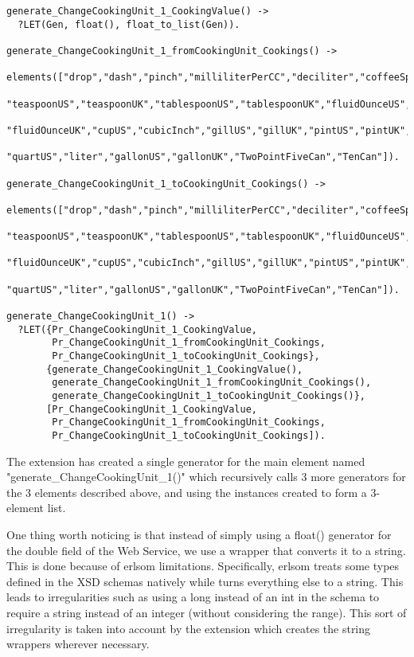 \documentclass[submission,copyright,a4]{eptcs}
\begin{document}
\begin{lstlisting}
generate_ChangeCookingUnit_1_CookingValue() ->
  ?LET(Gen, float(), float_to_list(Gen)).

generate_ChangeCookingUnit_1_fromCookingUnit_Cookings() ->
  elements(["drop","dash","pinch","milliliterPerCC","deciliter","coffeeSpoon","fluidDram",
             "teaspoonUS","teaspoonUK","tablespoonUS","tablespoonUK","fluidOunceUS",
             "fluidOunceUK","cupUS","cubicInch","gillUS","gillUK","pintUS","pintUK",
             "quartUS","liter","gallonUS","gallonUK","TwoPointFiveCan","TenCan"]).

generate_ChangeCookingUnit_1_toCookingUnit_Cookings() ->
  elements(["drop","dash","pinch","milliliterPerCC","deciliter","coffeeSpoon","fluidDram",
             "teaspoonUS","teaspoonUK","tablespoonUS","tablespoonUK","fluidOunceUS",
             "fluidOunceUK","cupUS","cubicInch","gillUS","gillUK","pintUS","pintUK",
             "quartUS","liter","gallonUS","gallonUK","TwoPointFiveCan","TenCan"]).

generate_ChangeCookingUnit_1() ->
  ?LET({Pr_ChangeCookingUnit_1_CookingValue,
        Pr_ChangeCookingUnit_1_fromCookingUnit_Cookings,
        Pr_ChangeCookingUnit_1_toCookingUnit_Cookings},
       {generate_ChangeCookingUnit_1_CookingValue(),    
        generate_ChangeCookingUnit_1_fromCookingUnit_Cookings(),
        generate_ChangeCookingUnit_1_toCookingUnit_Cookings()},
       [Pr_ChangeCookingUnit_1_CookingValue,
        Pr_ChangeCookingUnit_1_fromCookingUnit_Cookings, 
        Pr_ChangeCookingUnit_1_toCookingUnit_Cookings]).
\end{lstlisting}

The extension has created a single generator for the main element named "generate\_ChangeCookingUnit\_1()" which recursively calls 3 more generators for the 3 elements described above, and using the instances created to form a 3-element list. 

One thing worth noticing is that instead of simply using a float() generator for the double field of the Web Service, we use a wrapper that converts it to a string. This is done because of erlsom limitations. Specifically, erlsom treats some types defined in the XSD schemas natively while turns everything else to a string. This leads to irregularities such as using a long instead of an int in the schema to require a string instead of an integer (without considering the range). This sort of irregularity is taken into account by the extension which creates the string wrappers wherever necessary.
\end{document}

